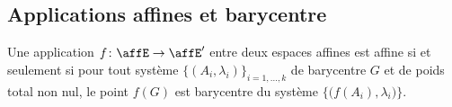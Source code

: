 \subsection{Applications affines et barycentre}

\begin{proposition}      \label{PROPooGSPZooRnVgiU}
    Une application \( f\colon \affE\to \affE'\) entre deux espaces affines est affine si et seulement si pour tout système \( \{ (A_i,\lambda_i) \}_{i=1,\ldots, k}\) de barycentre \( G\) et de poids total non nul, le point \( f(G)\) est barycentre du système \( \{ \big(f(A_i),\lambda_i\big) \}\).
\end{proposition}


